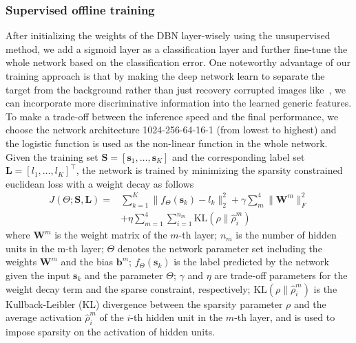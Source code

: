 \documentclass[preprint,12pt,review]{elsarticle}
\begin{document}
\subsubsection{Supervised offline training}
After initializing the weights of the DBN layer-wisely using the unsupervised method, we add a sigmoid layer as a classification layer and further fine-tune the whole network based on the classification error.
One noteworthy advantage of our training approach is that by making the deep network learn to separate the target from the background rather than just recovery corrupted images like~\cite{wang2013learning}, we can incorporate more discriminative information into the learned generic features.
To make a trade-off between the inference speed and the final performance, we choose the network architecture 1024-256-64-16-1 (from lowest to highest) and the logistic function is used as the non-linear function in the whole network.
Given the training set $\mathbf{S}=[\mathbf{s}_1,\ldots,\mathbf{s}_K]$ and the corresponding label set $\mathbf{L}=[l_1,\ldots,l_K]^{\top}$, the network is trained by minimizing the sparsity constrained euclidean loss with a weight decay as follows
\begin{equation}\label{eq:loss}
\begin{split}
  J(\Theta;\mathbf{S},\mathbf{L})=& \sum\limits_{k=1}^{K}\|f_{\Theta}(\mathbf{s}_k)-l_k\|_2^2+\gamma\sum\limits_{m}^{4}\|\mathbf{W}^m\|_F^2
  \\&+\eta\sum_{m=1}^{4}\sum_{i=1}^{n_m} \mathrm{KL}(\rho\|\hat{\rho}^m_i)
  \end{split}
\end{equation}
where $\mathbf{W}^m$ is the weight matrix of the $m$-th layer; ${n_m}$ is the number of hidden units in the m-th layer;
$\Theta$ denotes the network parameter set including the weights $\mathbf{W}^m$ and the bias $\mathbf{b}^m$;
$f_{\Theta}(\mathbf{s}_k)$ is the label predicted by the network given the input $\mathbf{s}_k$ and the parameter $\Theta$;
$\gamma$ and $\eta$ are trade-off parameters for the weight decay term and the sparse constraint, respectively;
$\mathrm{KL}(\rho\|\hat{\rho}^m_i)$ is the Kullback-Leibler (KL) divergence between the sparsity parameter $\rho$ and the average activation $\hat{\rho}^m_i$ of the $i$-th hidden unit in the $m$-th layer, and is used to impose sparsity on the activation of hidden units.
\end{document}
